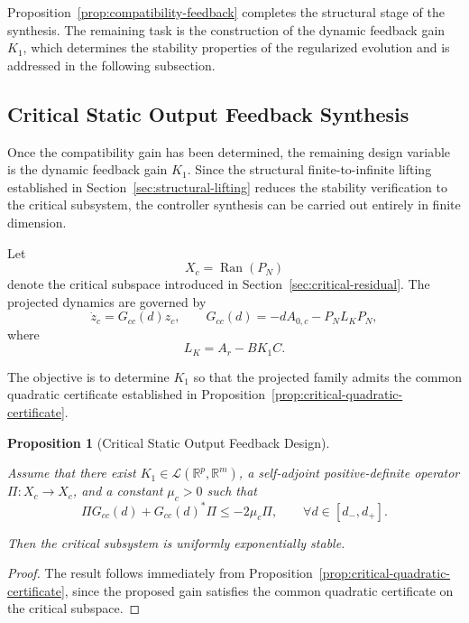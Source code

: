 \documentclass[pdflatex,sn-mathphys-num]{sn-jnl}
\theoremstyle{thmstyleone}%
\newtheorem{proposition}[theorem]{Proposition}%
\theoremstyle{thmstyletwo}%
\theoremstyle{thmstylethree}%
\begin{document}
Proposition~\ref{prop:compatibility-feedback} completes the structural stage of the synthesis. The remaining task is the construction of the dynamic feedback gain \(K_1\), which determines the stability properties of the regularized evolution and is addressed in the following subsection.

\subsection{Critical Static Output Feedback Synthesis}
\label{subsec:critical-synthesis}

Once the compatibility gain has been determined, the remaining design
variable is the dynamic feedback gain \(K_1\). Since the structural
finite-to-infinite lifting established in Section~\ref{sec:structural-lifting} reduces the stability verification to the critical subsystem, the controller synthesis can be carried out entirely in finite dimension.

Let
\[
X_c=\operatorname{Ran}(P_N)
\]
denote the critical subspace introduced in Section~\ref{sec:critical-residual}. The projected dynamics are governed by
\begin{equation}
\dot z_c
=
G_{cc}(d)z_c,
\qquad
G_{cc}(d)
=
-dA_{0,c}
-
P_NL_KP_N,
\label{eq:critical-synthesis-system}
\end{equation}
where
\[
L_K=A_r-BK_1C.
\]

The objective is to determine \(K_1\) so that the projected family admits the common quadratic certificate established in
Proposition~\ref{prop:critical-quadratic-certificate}.

\begin{proposition}[Critical Static Output Feedback Design]
\label{prop:critical-sof-design}

Assume that there exist \(K_1\in\mathcal L(\mathbb R^p,\mathbb R^m)\), a self-adjoint positive-definite operator \(\Pi:X_c\rightarrow X_c\), and a constant \(\mu_c>0\)
such that
\[
\Pi G_{cc}(d)
+
G_{cc}(d)^*\Pi
\le
-2\mu_c\Pi,
\qquad
\forall d\in[d_-,d_+].
\]

Then the critical subsystem is uniformly exponentially stable.

\end{proposition}

\begin{proof}

The result follows immediately from Proposition~\ref{prop:critical-quadratic-certificate}, since the proposed gain satisfies the common quadratic certificate on the critical subspace.

\end{proof}
\end{document}

